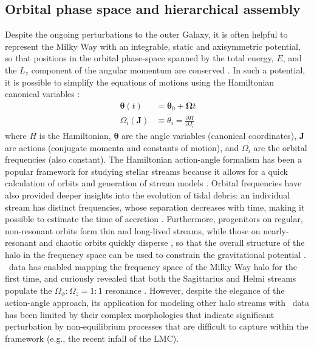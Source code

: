 \documentclass[final,5p,times,twocolumn,authoryear]{elsarticle}
\begin{document}
\subsection{Orbital phase space and hierarchical assembly}
Despite the ongoing perturbations to the outer Galaxy, it is often helpful to represent the Milky Way with an integrable, static and axisymmetric potential, so that positions in the orbital phase-space spanned by the total energy, $E$, and the $L_z$ component of the angular momentum are conserved \citep{noether:1918}.
In such a potential, it is possible to simplify the equations of motions using the Hamiltonian canonical variables \citep{goldstein:2002, helmi:1999, tremaine:1999, eyre:2011}:
\begin{align}
\pmb{\theta}(t) &= \pmb{\theta}_0 + \pmb{\Omega} t
\label{eq:angle}
\\
\Omega_i(\pmb{J}) &\equiv \dot{\theta}_i = \frac{\partial H}{\partial J_i}
\label{eq:frequency}
\end{align}
where $H$ is the Hamiltonian, $\pmb{\theta}$ are the angle variables (canonical coordinates), $\pmb{J}$ are actions (conjugate momenta and constants of motion), and $\Omega_i$ are the orbital frequencies (also constant).
The Hamiltonian action-angle formalism has been a popular framework for studying stellar streams because it allows for a quick calculation of orbits and generation of stream models \citep[e.g.,][]{eyre:2011,sanders:2013a,bovy:2014, vasiliev:2019}.
Orbital frequencies have also provided deeper insights into the evolution of tidal debris: an individual stream has distinct frequencies, whose separation decreases with time, making it possible to estimate the time of accretion \citep{gomez:2010}.
Furthermore, progenitors on regular, non-resonant orbits form thin and long-lived streams, while those on nearly-resonant and chaotic orbits quickly disperse \citep{price-whelan:2016a, price-whelan:2016b, yavetz:2023}, so that the overall structure of the halo in the frequency space can be used to constrain the gravitational potential \citep{valluri:2012, yavetz:2021}.
\gaia\ data has enabled mapping the frequency space of the Milky Way halo for the first time, and curiously revealed that both the Sagittarius and Helmi streams populate the $\Omega_\phi:\Omega_z=1:1$ resonance \citep{koppelman:2021a, dodd:2022}.
However, despite the elegance of the action-angle approach, its application for modeling other halo streams with \gaia\ data has been limited by their complex morphologies that indicate significant perturbation by non-equilibrium processes that are difficult to capture within the framework (e.g., the recent infall of the LMC).
\end{document}
